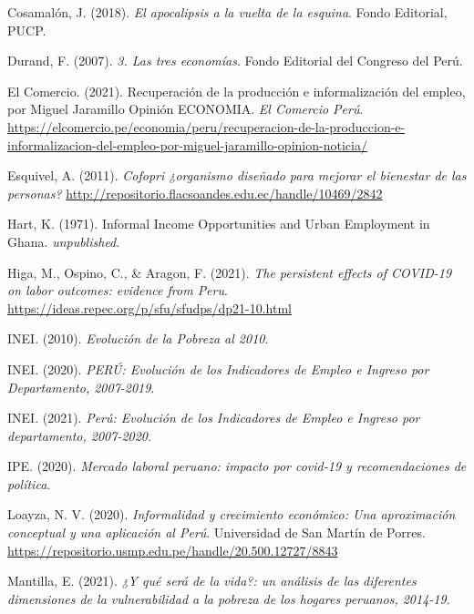\documentclass[
  letterpaper,
  12pt,
  oneside,
  spanish,
  doublespacing,
  headsepline,
  parskip]{MastersDoctoralThesis}
\newlength{\cslhangindent}
\newlength{\cslentryspacingunit} %
\newenvironment{CSLReferences}[2] %
 {%
  \setlength{\parindent}{0pt}
  \ifodd #1
  \let\oldpar\par
  \def\par{\hangindent=\cslhangindent\oldpar}
  \fi
  \setlength{\parskip}{#2\cslentryspacingunit}
 }%
 {}
\begin{document}
\begin{CSLReferences}{1}{0}
\leavevmode{}%
Cosamalón, J. (2018). \emph{El apocalipsis a la vuelta de la esquina}.
Fondo Editorial, PUCP.

\leavevmode{}%
Durand, F. (2007). \emph{3. Las tres economías}. Fondo Editorial del
Congreso del Perú.

\leavevmode{}%
El Comercio. (2021). Recuperación de la producción e informalización del
empleo, por Miguel Jaramillo \textbar{} Opinión \textbar{} ECONOMIA.
\emph{El Comercio Perú}.
\url{https://elcomercio.pe/economia/peru/recuperacion-de-la-produccion-e-informalizacion-del-empleo-por-miguel-jaramillo-opinion-noticia/}

\leavevmode{}%
Esquivel, A. (2011). \emph{Cofopri ¿organismo diseñado para mejorar el
bienestar de las personas?}
\url{http://repositorio.flacsoandes.edu.ec/handle/10469/2842}

\leavevmode{}%
Hart, K. (1971). Informal Income Opportunities and Urban Employment in
Ghana. \emph{unpublished}.

\leavevmode{}%
Higa, M., Ospino, C., \& Aragon, F. (2021). \emph{The persistent effects
of COVID-19 on labor outcomes: evidence from Peru}.
\url{https://ideas.repec.org/p/sfu/sfudps/dp21-10.html}

\leavevmode{}%
INEI. (2010). \emph{Evolución de la Pobreza al 2010}.

\leavevmode{}%
INEI. (2020). \emph{PERÚ: Evolución de los Indicadores de Empleo e
Ingreso por Departamento, 2007-2019}.

\leavevmode{}%
INEI. (2021). \emph{Perú: Evolución de los Indicadores de Empleo e
Ingreso por departamento, 2007-2020}.

\leavevmode{}%
IPE. (2020). \emph{Mercado laboral peruano: impacto por covid-19 y
recomendaciones de política}.

\leavevmode{}%
Loayza, N. V. (2020). \emph{Informalidad y crecimiento económico: Una
aproximación conceptual y una aplicación al Perú}. Universidad de San
Martín de Porres.
\url{https://repositorio.usmp.edu.pe/handle/20.500.12727/8843}

\leavevmode{}%
Mantilla, E. (2021). \emph{¿Y qué será de la vida?: un análisis de las
diferentes dimensiones de la vulnerabilidad a la pobreza de los hogares
peruanos, 2014-19}.


\end{CSLReferences}
\end{document}
